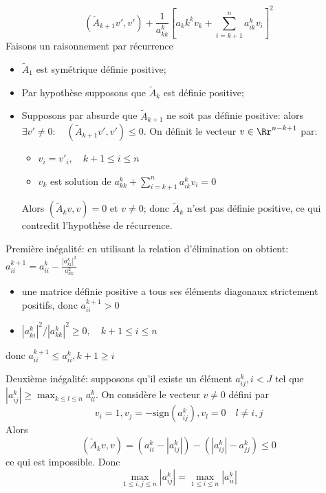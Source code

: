 {\begin{enumerate}
{$$(\tilde{A}_{k+1}v',v') +\frac{1}{a_{kk}^k} [a_kk^kv_k +\sum_{i=k+1}^na_{ik}^kv_i]^2$$
Faisons un raisonnement par r\'ecurrence
\begin{itemize}
\item $\tilde{A}_1$ est sym\'etrique d\'efinie positive;
\item Par hypoth\`ese supposons que $\tilde{A}_k$ est d\'efinie positive;
\item Supposons par absurde que $\tilde{A}_{k+1}$ ne soit pas d\'efinie positive: alors $\exists v'\neq 0:\quad (\tilde{A}_{k+1}v',v')\leq 0$. On d\'efinit le vecteur $v\in\Rr^{n-k+1}$ par:
\begin{itemize}
\item $v_i=v'_i,\quad k+1\leq i\leq n$
\item $v_k$ est solution de $a_{kk}^k +\sum_{i=k+1}^n a_{ik}^k v_i=0$
\end{itemize}
Alors $(\tilde{A}_kv,v)=0$ et $v\neq 0$; donc $\tilde{A}_k$ n'est pas d\'efinie positive, ce qui contredit l'hypoth\`ese de r\'ecurrence.
\end{itemize}
Premi\`ere in\'egalit\'e: en utilisant la relation d'\'elimination on obtient: $a_{ii}^{k+1}=a_{ii}^k -\frac{\left|a_{ki}^k\right|^2}{a_{kk}^2}$
\begin{itemize}
\item une matrice d\'efinie positive a tous ses \'el\'ements diagonaux strictement positifs, donc $a_{ii}^{k+1}>0$
\item $\left|a_{ki}^k\right|^2/\left|a_{kk}^k\right|^2 \geq 0, \quad k+1\leq i\leq n$
\end{itemize}
donc $a_{ii}^{k+1}\leq a_{ii}^k, k+1\geq i$

Deuxi\`eme in\'egalit\'e: supposons qu'il existe un \'el\'ement $a_{ij}^k, i<J$ tel que $\left|a_{ij}^k\right| \geq \max_{k\leq l \leq n} a_{ll}^k$. On consid\`ere le vecteur $v\neq 0$ d\'efini par
$$v_i=1, v_j=-\mbox{sign} (a_{ij}^k), v_l=0\quad l\neq i,j$$
Alors
$$(\tilde{A}_k v,v) =( a_{ii}^k -\left|a_{ij}^k\right|)-(\left|a_{ij}^k\right| -a_{jj}^k) \leq 0$$
ce qui est impossible. Donc
$$\max_{1\leq i,j\leq n}\left|a_{ij}^{k}\right|=\max_{1\leq i \leq n}\left|a_{ii}^k\right|$$
}
\end{enumerate}
}
